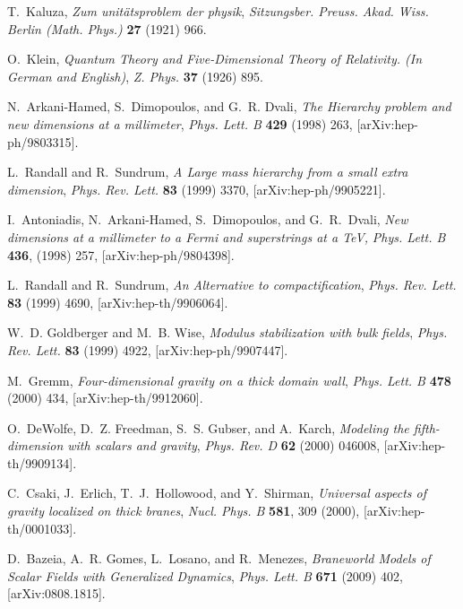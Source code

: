 \begin{thebibliography}{99}
T.~Kaluza, \emph{Zum unit{\"a}tsproblem der physik}, {\emph{Sitzungsber.
  Preuss. Akad. Wiss. Berlin (Math. Phys.)} {\bfseries 27} (1921) 966}.

O.~Klein, \emph{{Quantum Theory and Five-Dimensional Theory of Relativity. (In
  German and English)}}, {\emph{Z.
  Phys.} {\bfseries 37} (1926) 895}.

N.~Arkani-Hamed, S.~Dimopoulos, and G.~R. Dvali, \emph{{The Hierarchy problem
  and new dimensions at a millimeter}},
 {\emph{Phys. Lett. B}
  {\bfseries 429} (1998) 263},
  [{{\ttfamily arXiv:hep-ph/9803315}}].



L.~Randall and R.~Sundrum, \emph{{A Large mass hierarchy from a small extra dimension}},
 {\emph{Phys. Rev. Lett.}
  {\bfseries 83} (1999) 3370},
  [{{\ttfamily arXiv:hep-ph/9905221}}].


I.~Antoniadis, N.~Arkani-Hamed, S.~Dimopoulos, and G.~R.~Dvali,
\emph{{New dimensions at a millimeter to a Fermi and superstrings at a TeV,}}
{\emph{ Phys. Lett. B}
	{\bfseries 436}, (1998) 257},
[{{\ttfamily arXiv:hep-ph/9804398}}].

L.~Randall and R.~Sundrum, \emph{{An Alternative to compactification}},
 {\emph{Phys. Rev. Lett.}
  {\bfseries 83} (1999) 4690},
  [{{\ttfamily arXiv:hep-th/9906064}}].

W.~D. Goldberger and M.~B. Wise, \emph{{Modulus stabilization with bulk
  fields}}, {\emph{Phys.
  Rev. Lett.} {\bfseries 83} (1999) 4922},
  [{{\ttfamily arXiv:hep-ph/9907447}}].

M.~Gremm, \emph{{Four-dimensional gravity on a thick domain wall}},
  {\emph{Phys. Lett. B}
  {\bfseries 478} (2000) 434},
  [{{\ttfamily arXiv:hep-th/9912060}}].

O.~DeWolfe, D.~Z. Freedman, S.~S. Gubser, and A.~Karch, \emph{{Modeling the
  fifth-dimension with scalars and gravity}},
  {\emph{Phys. Rev. D}
  {\bfseries 62} (2000) 046008},
  [{{\ttfamily arXiv:hep-th/9909134}}].

 C.~Csaki, J.~Erlich, T.~J.~Hollowood, and Y.~Shirman,
 \emph{{Universal aspects of gravity localized on thick branes}},
 {\emph{Nucl. Phys. B} {\bfseries 581}, 309 (2000)},
 [{{\ttfamily arXiv:hep-th/0001033}}].


D.~Bazeia, A.~R. Gomes, L.~Losano, and R.~Menezes, \emph{{Braneworld Models of
  Scalar Fields with Generalized Dynamics}},
  {\emph{Phys. Lett. B}
  {\bfseries 671} (2009) 402},
  [{{\ttfamily arXiv:0808.1815}}].



\end{thebibliography}
